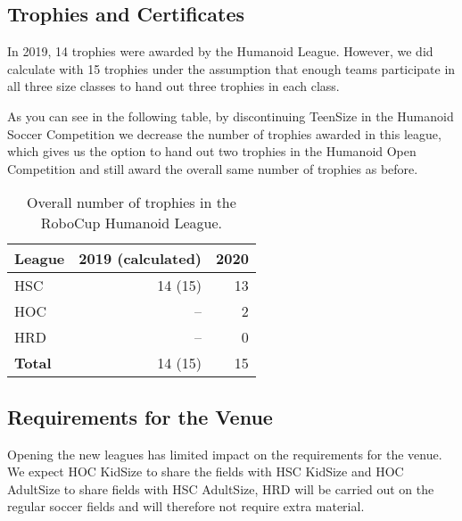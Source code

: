\documentclass{article}
\begin{document}
\subsection{Trophies and Certificates}

In 2019, 14 trophies were awarded by the Humanoid League. However, we did calculate with 15 trophies under the assumption that enough teams participate in all three size classes to hand out three trophies in each class. 

As you can see in the following table, by discontinuing TeenSize in the Humanoid Soccer Competition we decrease the number of trophies awarded in this league, which gives us the option to hand out two trophies in the Humanoid Open Competition and still award the overall same number of trophies as before.

\begin{table}[h]
  \centering
  \begin{tabular}{l | r | r}
    League & 2019 (calculated) & 2020\\
    \hline
    HSC & 14 (15) & 13\\ 
    HOC & -- & 2\\ 
    HRD & -- & 0\\
    \hline
    \textbf{Total} & 14 (15) & 15
  \end{tabular}
   \caption{Overall number of trophies in the RoboCup Humanoid League.}

\end{table}

\subsection{Requirements for the Venue}

Opening the new leagues has limited impact on the requirements for the venue.
We expect HOC KidSize to share the fields with HSC KidSize and HOC AdultSize to share fields with HSC AdultSize,
HRD will be carried out on the regular soccer fields and will therefore not require
extra material.
\end{document}

